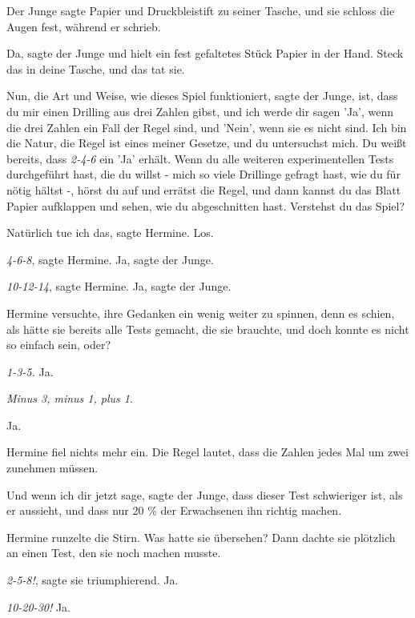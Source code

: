Der Junge sagte \glqq{}Papier\grqq{} und \glqq{}Druckbleistift\grqq{} zu seiner
Tasche, und sie schloss die Augen fest, während er schrieb.

\glqq{}Da\grqq{}, sagte der Junge und hielt ein fest gefaltetes Stück Papier in
der Hand. \glqq{}Steck das in deine Tasche\grqq{}, und das tat sie.

\glqq{}Nun, die Art und Weise, wie dieses Spiel funktioniert\grqq{}, sagte der
Junge, \glqq{}ist, dass du mir einen Drilling aus drei Zahlen gibst, und ich
werde dir sagen 'Ja', wenn die drei Zahlen ein Fall der Regel sind, und 'Nein',
wenn sie es nicht sind. Ich bin die Natur, die Regel ist eines meiner Gesetze,
und du untersuchst mich. Du weißt bereits, dass \emph{2-4-6} ein 'Ja' erhält.
Wenn du alle weiteren experimentellen Tests durchgeführt hast, die du willst -
mich so viele Drillinge gefragt hast, wie du für nötig hältst -, hörst du auf
und errätst die Regel, und dann kannst du das Blatt Papier aufklappen und sehen,
wie du abgeschnitten hast. Verstehst du das Spiel?\grqq{}

\glqq{}Natürlich tue ich das\grqq{}, sagte Hermine. \glqq{}Los.\grqq{}

\glqq{}\emph{4-6-8}\grqq{}, sagte Hermine. \glqq{}Ja\grqq{}, sagte der Junge.

\glqq{}\emph{10-12-14}\grqq{}, sagte Hermine. \glqq{}Ja\grqq{}, sagte der Junge.

Hermine versuchte, ihre Gedanken ein wenig weiter zu spinnen, denn es schien,
als hätte sie bereits alle Tests gemacht, die sie brauchte, und doch konnte es
nicht so einfach sein, oder?

\emph{\glqq{}1-3-5.}\grqq{} \glqq{}Ja.\grqq{}

\glqq{}\emph{Minus 3, minus 1, plus 1}.\grqq{}

\glqq{}Ja.\grqq{}

Hermine fiel nichts mehr ein. \glqq{}Die Regel lautet, dass die Zahlen jedes Mal
um zwei zunehmen müssen.\grqq{}

\glqq{}Und wenn ich dir jetzt sage\grqq{}, sagte der Junge, \glqq{}dass dieser
Test schwieriger ist, als er aussieht, und dass nur 20 \% der Erwachsenen ihn
richtig machen.\grqq{}

Hermine runzelte die Stirn. Was hatte sie übersehen? Dann dachte sie plötzlich
an einen Test, den sie noch machen musste.

\glqq{}\emph{2-5-8!\grqq{}}, sagte sie triumphierend. \glqq{}Ja.\grqq{}

\glqq{}\emph{10-20-30!}\grqq{} \glqq{}Ja.\grqq{}

